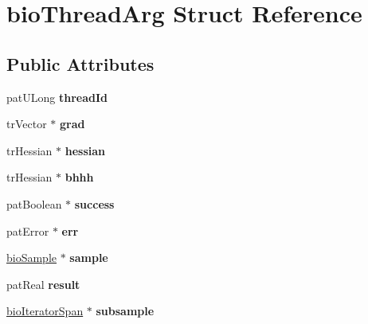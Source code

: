 \hypertarget{structbio_thread_arg}{}\section{bio\+Thread\+Arg Struct Reference}
\label{structbio_thread_arg}
\subsection*{Public Attributes}
\begin{DoxyCompactItemize}
\item 
\mbox{\label{structbio_thread_arg_a71651590a4abe0500229b13b515d065c}} 
pat\+U\+Long {\bfseries thread\+Id}
\item 
\mbox{\label{structbio_thread_arg_acec42127a4d46d20b9f0105138296085}} 
tr\+Vector $\ast$ {\bfseries grad}
\item 
\mbox{\label{structbio_thread_arg_a3aa7e38e9cbd96c9e272bc75e432dca9}} 
tr\+Hessian $\ast$ {\bfseries hessian}
\item 
\mbox{\label{structbio_thread_arg_aa320cced824d0ddfc5faea35462850af}} 
tr\+Hessian $\ast$ {\bfseries bhhh}
\item 
\mbox{\label{structbio_thread_arg_a2b9c8dd2a2a5cf7a99aeee9114be681d}} 
pat\+Boolean $\ast$ {\bfseries success}
\item 
\mbox{\label{structbio_thread_arg_a2f1aeb039fa4a97afe4c23b6dcd1500e}} 
pat\+Error $\ast$ {\bfseries err}
\item 
\mbox{\label{structbio_thread_arg_a12d093a11abfda07f88f948d970ca207}} 
\hyperlink{classbio_sample}{bio\+Sample} $\ast$ {\bfseries sample}
\item 
\mbox{\label{structbio_thread_arg_ab54d73747310ad3038ea440b8b968dd8}} 
pat\+Real {\bfseries result}
\item 
\mbox{\label{structbio_thread_arg_a4c9f9171fd905a56618d95738afe71b4}} 
\hyperlink{classbio_iterator_span}{bio\+Iterator\+Span} $\ast$ {\bfseries subsample}

\end{DoxyCompactItemize}
